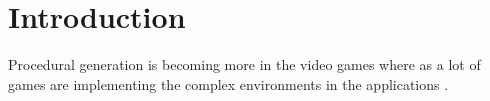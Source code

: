 \chapter{Introduction}

\large Procedural generation is becoming more in the video games where as a lot of games are implementing the complex environments in the applications \cite{parish2001procedural}. 
